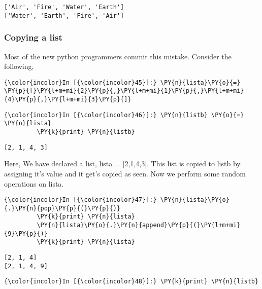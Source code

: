    \begin{Verbatim}[commandchars=\\\{\}]
['Air', 'Fire', 'Water', 'Earth']
['Water', 'Earth', 'Fire', 'Air']
    \end{Verbatim}

    \subsubsection{Copying a list}\label{copying-a-list}

    Most of the new python programmers commit this mistake. Consider the
following,

    \begin{Verbatim}[commandchars=\\\{\}]
{\color{incolor}In [{\color{incolor}45}]:} \PY{n}{lista}\PY{o}{=} \PY{p}{[}\PY{l+m+mi}{2}\PY{p}{,}\PY{l+m+mi}{1}\PY{p}{,}\PY{l+m+mi}{4}\PY{p}{,}\PY{l+m+mi}{3}\PY{p}{]}
\end{Verbatim}

    \begin{Verbatim}[commandchars=\\\{\}]
{\color{incolor}In [{\color{incolor}46}]:} \PY{n}{listb} \PY{o}{=} \PY{n}{lista}
         \PY{k}{print} \PY{n}{listb}
\end{Verbatim}

    \begin{Verbatim}[commandchars=\\\{\}]
[2, 1, 4, 3]
    \end{Verbatim}

    Here, We have declared a list, lista = {[}2,1,4,3{]}. This list is
copied to listb by assigning it's value and it get's copied as seen. Now
we perform some random operations on lista.

    \begin{Verbatim}[commandchars=\\\{\}]
{\color{incolor}In [{\color{incolor}47}]:} \PY{n}{lista}\PY{o}{.}\PY{n}{pop}\PY{p}{(}\PY{p}{)}
         \PY{k}{print} \PY{n}{lista}
         \PY{n}{lista}\PY{o}{.}\PY{n}{append}\PY{p}{(}\PY{l+m+mi}{9}\PY{p}{)}
         \PY{k}{print} \PY{n}{lista}
\end{Verbatim}

    \begin{Verbatim}[commandchars=\\\{\}]
[2, 1, 4]
[2, 1, 4, 9]
    \end{Verbatim}

    \begin{Verbatim}[commandchars=\\\{\}]
{\color{incolor}In [{\color{incolor}48}]:} \PY{k}{print} \PY{n}{listb}
\end{Verbatim}

